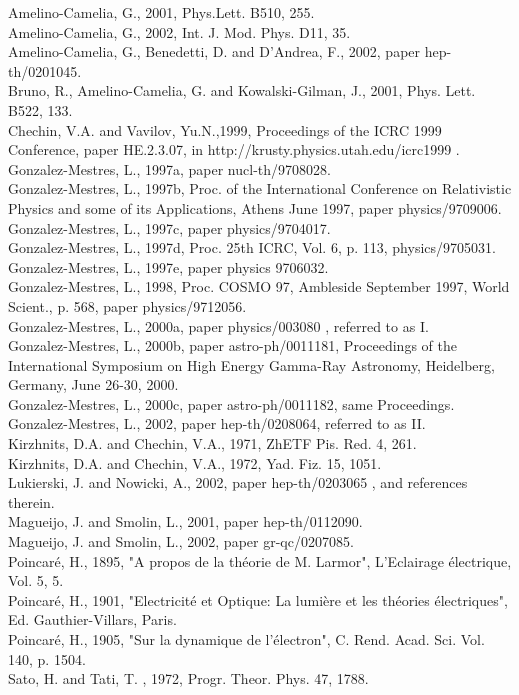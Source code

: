 \documentclass[a4paper,12pt,dvips]{article}
\begin{document}
\noindent
Amelino-Camelia, G., 2001, Phys.Lett. B510, 255. \\
Amelino-Camelia, G., 2002, Int. J. Mod. Phys. D11, 35.\\
Amelino-Camelia, G., Benedetti, D. and D'Andrea, F., 2002, paper hep-th/0201045.\\
Bruno, R., Amelino-Camelia, G. and Kowalski-Gilman, J., 2001, Phys. Lett. B522, 133.\\
Chechin, V.A. and Vavilov, Yu.N.,1999, Proceedings of the ICRC 1999 Conference, paper HE.2.3.07, in http://krusty.physics.utah.edu/\myHighlight{$\sim $}\coordHE{}icrc1999 .\\
Gonzalez-Mestres, L., 1997a, paper nucl-th/9708028.\\
Gonzalez-Mestres, L., 1997b, Proc. of the International
Conference on Relativistic Physics and some of its Applications, Athens June 1997, paper physics/9709006. \\
Gonzalez-Mestres, L., 1997c, paper physics/9704017.\\
Gonzalez-Mestres, L., 1997d, Proc. 25th ICRC, Vol. 6, p. 113, physics/9705031.\\
Gonzalez-Mestres, L., 1997e, paper physics 9706032.\\
Gonzalez-Mestres, L., 1998, Proc. COSMO 97, Ambleside September 1997,
World Scient., p. 568, paper physics/9712056. \\
Gonzalez-Mestres, L., 2000a, paper physics/003080 , referred to as I.\\
Gonzalez-Mestres, L., 2000b, paper astro-ph/0011181, Proceedings of the International Symposium on High Energy Gamma-Ray Astronomy, Heidelberg, Germany, June 26-30, 2000. \\
Gonzalez-Mestres, L., 2000c, paper astro-ph/0011182, same Proceedings.\\
Gonzalez-Mestres, L., 2002, paper hep-th/0208064, referred to as II.\\
Kirzhnits, D.A. and Chechin, V.A., 1971, ZhETF Pis. Red. 4, 261.\\
Kirzhnits, D.A. and Chechin, V.A., 1972, Yad. Fiz. 15, 1051. \\ 
Lukierski, J. and Nowicki, A., 2002, paper hep-th/0203065 , and references therein. \\
Magueijo, J. and Smolin, L., 2001, paper hep-th/0112090. \\
Magueijo, J. and Smolin, L., 2002, paper gr-qc/0207085. \\
Poincar\'e, H., 1895, "A propos de la th\'eorie de M. Larmor",
L'Eclairage \'electrique, Vol. 5,  5.\\
Poincar\'e, H., 1901, "Electricit\'e et Optique: La lumi\`ere
et les th\'eories \'electriques", Ed. Gauthier-Villars, Paris.\\
Poincar\'e, H., 1905, "Sur la dynamique de l'\'electron", C.
Rend. Acad. Sci. Vol. 140, p. 1504.\\
Sato, H. and Tati, T. , 1972, Progr. Theor. Phys. 47, 1788.\\
\end{document}
